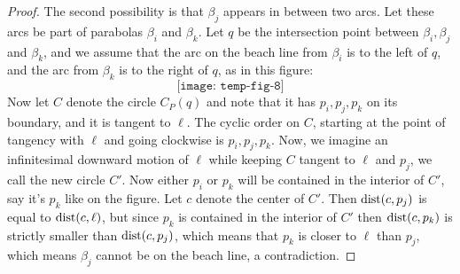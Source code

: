 \begin{proof}
The second possibility is that $\beta_j$ appears in between two arcs. Let these arcs be part of parabolas $\beta_i$ and $\beta_k$. Let $q$ be the intersection point between $\beta_i, \beta_j$ and $\beta_k$, and we assume that the arc on the beach line from $\beta_i$ is to the left of $q$, and the arc from $\beta_k$ is to the right of $q$, as in this figure:
\[
    \texttt{[image: temp-fig-8]}
\]
Now let $C$ denote the circle $C_P(q)$ and note that it has $p_i, p_j, p_k$ on its boundary, and it is tangent to $\ell$. The cyclic order on $C$, starting at the point of tangency with $\ell$ and going clockwise is $p_i, p_j, p_k$. Now, we imagine an infinitesimal downward motion of $\ell$ while keeping $C$ tangent to $\ell$ and $p_j$, we call the new circle $C'$. Now either $p_i$ or $p_k$ will be contained in the interior of $C'$, say it's $p_k$ like on the figure. Let $c$ denote the center of $C'$. Then $\operatorname{dist}(c, p_j)$ is equal to $\operatorname{dist}(c, \ell)$, but since $p_k$ is contained in the interior of $C'$ then $\operatorname{dist}(c, p_k)$ is strictly smaller than $\operatorname{dist}(c, p_j)$, which means that $p_k$ is closer to $\ell$ than $p_j$, which means $\beta_j$ cannot be on the beach line, a contradiction.
\end{proof}

